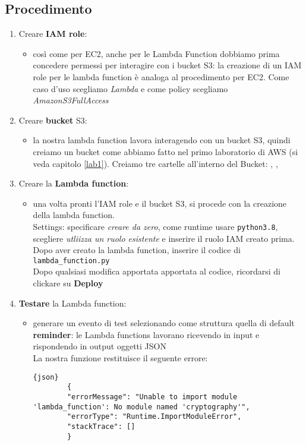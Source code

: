 \subsection{Procedimento}
\begin{enumerate}
    \item Creare \textbf{IAM role}:
    \begin{itemize}
        \item così come per EC2, anche per le Lambda Function dobbiamo prima concedere permessi per interagire con i bucket S3: la creazione di un IAM role per le lambda function è analoga al procedimento per EC2. Come caso d'uso scegliamo \textit{Lambda} e come policy scegliamo \textit{AmazonS3FullAccess}
    \end{itemize}

    \item Creare \textbf{bucket} S3:
    \begin{itemize}
        \item la nostra lambda function lavora interagendo con un bucket S3, quindi creiamo un bucket come abbiamo fatto nel primo laboratorio di AWS (si veda capitolo \ref{lab1}).
        Creiamo tre cartelle all'interno del Bucket: , , 
    \end{itemize}

    \item Creare la \textbf{Lambda function}:
    \begin{itemize}
        \item una volta pronti l'IAM role e il bucket S3, si procede con la creazione della lambda function.\\
        Settings: specificare \textit{creare da zero}, come runtime usare \verb|python3.8|, scegliere \textit{utliizza un ruolo esistente} e inserire il ruolo IAM creato prima.\\
        Dopo aver creato la lambda function, inserire il codice di \verb|lambda_function.py| \\
        Dopo qualsiasi modifica apportata apportata al codice, ricordarsi di clickare su \textbf{Deploy}
    \end{itemize}

    \item \textbf{Testare} la Lambda function:
    \begin{itemize}
        \item generare un evento di test selezionando come struttura quella di default
        \textbf{reminder}: le Lambda functions lavorano ricevendo in input e rispondendo in output oggetti JSON\\
        La nostra funzione restituisce il seguente errore:
        \begin{lstlisting}{json}
        {
        "errorMessage": "Unable to import module 'lambda_function': No module named 'cryptography'", 
        "errorType": "Runtime.ImportModuleError", 
        "stackTrace": []
        }
        \end{lstlisting}
    \end{itemize}


\end{enumerate}

